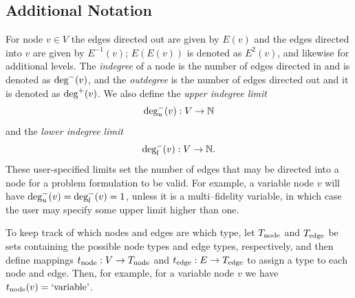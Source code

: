 \subsection{Additional Notation}
For node $v \in V$ the edges directed out are given by $E(v)$ and the edges directed into $v$ are given by $E^{-1}(v)$; $E(E(v))$ is denoted as $E^2(v)$, and likewise for additional levels. 
The \emph{indegree} of a node is the number of edges directed in and is denoted as $\textrm{deg}^-(v)$, and the \emph{outdegree} is the number of edges directed out and it is denoted as $\textrm{deg}^+(v)$.
We also define the \emph{upper indegree limit} 
\begin{equation}
\textrm{deg}_u^-(v):V \to \mathbb{N}
\end{equation} 
and the \emph{lower indegree limit}
\begin{equation}
\textrm{deg}_l^-(v):V \to \mathbb{N}.
\end{equation}
These user-specified limits set the number of edges that may be directed into a node for a problem formulation to be valid. For example, a variable node $v$ will have $\textrm{deg}_u^-(v) = \textrm{deg}_l^-(v) = 1$, unless it is a multi--fidelity variable, in which case the user may specify some upper limit higher than one.

To keep track of which nodes and edges are which type, let $T_\textrm{node}$ and $T_\textrm{edge}$ be sets containing the possible node types and edge types, respectively, and then define mappings $t_\textrm{node}:V \to T_\textrm{node}$ and $t_\textrm{edge}:E \to T_\textrm{edge}$ to assign a type to each node and edge.
Then, for example, for a variable node $v$ we have $t_\textrm{node}(v) = \textrm{`variable'}$.




